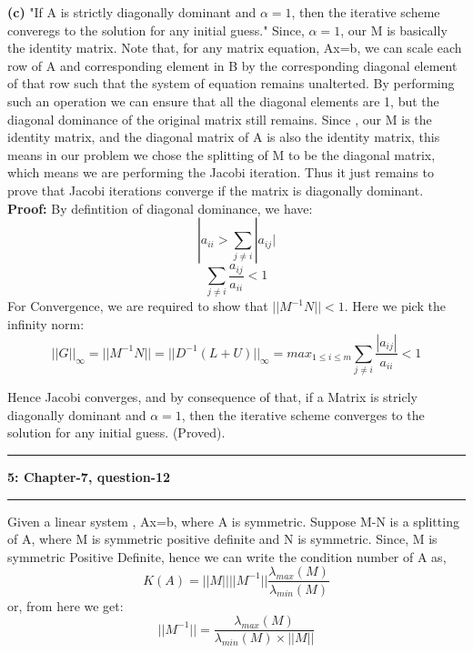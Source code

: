 \documentclass{article}
\newcommand\question[2]{\vspace{.25in}\hrule\textbf{#1: #2}\hrule\vspace{.10in}}
\renewcommand\part[1]{\vspace{.10in}\textbf{(#1)}}
\begin{document}
  \part{c} "If A is strictly diagonally dominant and $\alpha = 1$, then the iterative scheme converegs to the solution for any initial guess." \newline
  Since, $\alpha = 1$, our M is basically the identity matrix. Note that, for any matrix equation, Ax=b, we can scale each row of A and corresponding element in B by the corresponding  diagonal element of that row such that the system of equation remains unalterted. By performing such an operation we can ensure that all the diagonal elements are 1, but the diagonal dominance of the original matrix still remains. Since , our M is the identity matrix, and the diagonal matrix of A is also the identity matrix, this means in our problem we chose the splitting of M to be the diagonal matrix, which means we are performing the Jacobi iteration. Thus it just remains to prove that Jacobi iterations converge if the matrix is diagonally dominant.  \newline
  \textbf {Proof:} \newline
  By defintition of diagonal dominance, we have:
  \[ |a_{ii} > \sum_{j\neq i}|a_{ij}|\]
  \[ \sum_{j\neq i} \dfrac{a_{ij}}{a_{ii}} < 1\]
  For Convergence, we are required to show that $||M^{-1}N|| < 1$. Here we pick the infinity norm: \newline
  \[ ||G||_{\infty} = ||M^{-1}N|| = ||D^{-1}(L+U)||_{\infty} = max_{1\leq i \leq m} \sum_{j\neq i} \dfrac{|a_{ij}|}{a_{ii}} < 1 \]

  Hence Jacobi converges, and by consequence of that, if a Matrix is stricly diagonally dominant and $\alpha=1$, then the iterative scheme converges to the solution for any initial guess. (Proved). \newline

  \question{5}{Chapter-7, question-12}
   Given a linear system , Ax=b, where A is symmetric. Suppose M-N is a splitting of A, where M is symmetric positive definite and N is symmetric. \newline
   Since, M is symmetric Positive Definite, hence we can write the condition number of A as, \newline
  \[K(A) = ||M||||M^{-1}||\dfrac{\lambda_{max}(M)}{\lambda_{min}(M)}\]
  or, from here we get: \newline
  \begin{equation}
	  ||M^{-1}|| = \dfrac{\lambda_{max}(M)}{\lambda_{min}(M) \times ||M||}
  \end{equation}
\end{document}
